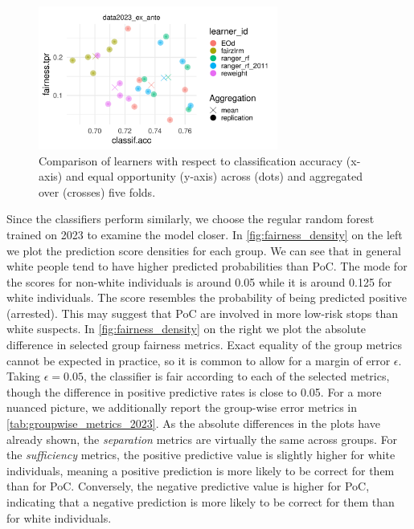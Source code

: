 \begin{figure}
    \centering
    \includegraphics[width=0.7\textwidth]{../figures/sqf_case_study_plot3.pdf}
    \caption{Comparison of learners with respect to classification accuracy (x-axis) and equal opportunity (y-axis) across (dots) and aggregated over (crosses) five folds.}
    \label{fig:fairness_experiment}
\end{figure}

Since the classifiers perform similarly, we choose the regular random forest trained on 2023 to examine the model closer.
In \autoref{fig:fairness_density} on the left we plot the prediction score densities for each group. We can see that in general white people tend to have higher predicted probabilities than PoC. The mode for the scores for non-white individuals is around 0.05 while it is around 0.125 for white individuals. The score resembles the probability of being predicted positive (arrested). This may suggest that PoC are involved in more low-risk stops than white suspects.
In \autoref{fig:fairness_density} on the right we plot the absolute difference in selected group fairness metrics.
Exact equality of the group metrics cannot be expected in practice, so it is common to allow for a margin of error $\epsilon$. Taking $\epsilon = 0.05$, the classifier is fair according to each of the selected metrics, though the difference in positive predictive rates is close to 0.05.
For a more nuanced picture, we additionally report the group-wise error metrics in \autoref{tab:groupwise_metrics_2023}.
As the absolute differences in the plots have already shown, the \textit{separation} metrics are virtually the same across groups. For the \textit{sufficiency} metrics, the positive predictive value is slightly higher for white individuals, meaning a positive prediction is more likely to be correct for them than for PoC. Conversely, the negative predictive value is higher for PoC, indicating that a negative prediction is more likely to be correct for them than for white individuals.

